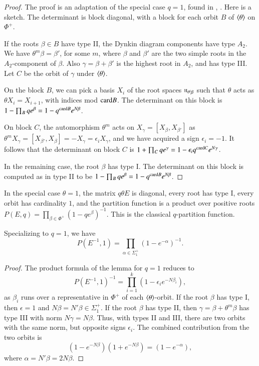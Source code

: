 \begin{proof} The proof is an adaptation  of the special case $q=1$, 
found in \cite{jantzen1977darstellungen}, \cite{wendt2001weyl}.  Here is a sketch.
The determinant is block diagonal, with a block for each orbit $B$ of $\langle{\theta}\rangle$ on $\Phi^+$.

If the roots $\beta\in B$ have type II, the Dynkin diagram components have type $A_2$.
We have $\theta^m \beta = \beta'$, for some $m$, where $\beta$ and $\beta'$ are the two simple roots in the $A_2$-component of $\beta$.
Also $\gamma = \beta + \beta'$ is the highest root in $A_2$, and has type III.  
Let $C$ be the orbit of $\gamma$ under $\langle{\theta}\rangle$.  

On the block $B$, we can pick a basis $X_i$ of the
root spaces ${\mathfrak n}_{\theta^i\beta}$ such that $\theta$ acts as $\theta X_i = X_{i+1}$, with indices mod ${\operatorname{card}}{B}$.
The determinant on this block is $1- \prod_B {q e^{\beta}} = 1- q^{{\operatorname{card}} B} e^{N \beta}$.

On block $C$, the automorphism $\theta^m$ acts on $X_\gamma = [X_\beta,X_{\beta'}]$ 
as $\theta^m X_\gamma = [X_{\beta'},X_\beta] = -X_\gamma =\epsilon_i X_\gamma$, 
and we have acquired a sign $\epsilon_i=-1$.  
It follows that the determinant on block $C$
is $1+\prod_C {q e^\gamma} = 1-\epsilon_i q^{{\operatorname{card}} C} e^{N\gamma}$.

In the remaining case,  the root $\beta$ has type I.  
The determinant on this block is computed as in  type II to be $1- \prod_B q e^{\beta} = 1- q^{{\operatorname{card}}{B}} e^{N \beta}$.
\end{proof}


In the special case $\theta=1$, the matrix $q \theta E$ is diagonal, every root has type I, every orbit has cardinality $1$,
and the partition function
is a product over positive roots 
$P(E,q) = \prod_{\beta\in\Phi^+} (1- q e^\beta)^{-1}$.  This is the classical $q$-partition function.


\begin{corollary} Specializing to $q=1$, we have
\[
P(E^{-1},1) = \prod_{\alpha\in\Sigma^+_1} (1-e^{-\alpha})^{-1}.
\]
\end{corollary}

\begin{proof}  The product formula of the lemma for $q=1$ reduces to
\[
P(E^{-1},1)^{-1} = \prod_{i=1}^k (1- \epsilon_i e^{-N\beta_i}),
\]
as $\beta_i$ runs over a representative in $\Phi^+$ of each $\langle{\theta}\rangle$-orbit.
If the root $\beta$ has type I, then $\epsilon=1$ and $N\beta = N'\beta \in \Sigma^+_1$.
If the root $\beta$ has type II, then 
$\gamma = \beta+\theta^m\beta$ has type III with norm $N\gamma = N\beta$.
Thus, with types II and III, there are two orbits with the same norm, but opposite signs $\epsilon_i$.  
The combined contribution from the
two orbits is
\[
(1- e^{-N\beta})(1+e^{-N\beta}) = (1-e^{-\alpha}),
\]
where $\alpha = N'\beta = 2N\beta$.
\end{proof}

